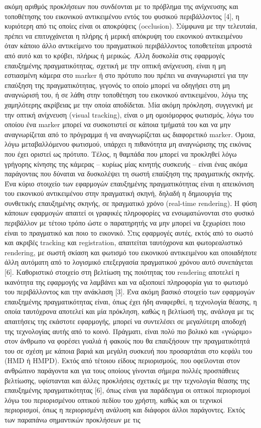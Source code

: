 ακόμη αριθμός προκλήσεων που συνδέονται με το πρόβλημα της ανίχνευσης και τοποθέτησης του εικονικού αντικειμένου εντός του φυσικού περιβάλλοντος [4], η κυριότερη από τις οποίες είναι οι αποκρύψεις (occlusion). Σύμφωνα με την τελευταία, πρέπει να επιτυγχάνεται η πλήρης ή μερική απόκρυψη του εικονικού αντικειμένου όταν κάποιο άλλο αντικείμενο του πραγματικού περιβάλλοντος τοποθετείται μπροστά από αυτό και το κρύβει, πλήρως ή μερικώς. Άλλη δυσκολία στις εφαρμογές επαυξημένης πραγματικότητας, σχετική με την οπτική ανίχνευση, είναι η μη εστιασμένη κάμερα στο marker ή στο πρότυπο που πρέπει να αναγνωριστεί για την επαύξηση της πραγματικότητας, γεγονός το οποίο μπορεί να οδηγήσει στη μη αναγνώρισή του, ή σε λάθη στην τοποθέτηση του εικονικού αντικειμένου, λόγω της χαμηλότερης ακρίβειας με την οποία αποδίδεται. Μία ακόμη πρόκληση, συγγενική με την οπτική ανίχνευση (visual tracking), είναι ο μη ομοιόμορφος φωτισμός, λόγω του οποίου ένα marker μπορεί να συσκοτιστεί σε κάποια τμήματά του και να μην αναγνωρίζεται από το πρόγραμμα ή να αναγνωρίζεται ως διαφορετικό marker. Όμοια, λόγω μεταβαλλόμενου φωτισμού, υπάρχει η πιθανότητα μη αναγνώρισης της εικόνας που έχει οριστεί ως πρότυπο. Τέλος, η θαμπάδα που μπορεί να προκληθεί λόγω γρήγορης κίνησης της κάμερας – κυρίως μίας κινητής συσκευής – είναι ένας ακόμα παράγοντας που δύναται να δυσκολέψει τη σωστή επαύξηση της πραγματικής σκηνής. Ένα κύριο στοιχείο των εφαρμογών επαυξημένης πραγματικότητας είναι η απεικόνιση του εικονικού αντικειμένου στην πραγματική σκηνή, δηλαδή η δημιουργία της συνθετικής επαυξημένης σκηνής, σε πραγματικό χρόνο (real-time rendering). Η φύση κάποιων εφαρμογών απαιτεί οι γραφικές πληροφορίες να ενσωματώνονται στο φυσικό περιβάλλον με τέτοιο τρόπο ώστε ο παρατηρητής να μην μπορεί να ξεχωρίσει ποιο είναι το πραγματικό και ποιο το εικονικό. Στις εφαρμογές αυτές, εκτός από το σωστό και ακριβές tracking και registration, απαιτείται ταυτόχρονα και φωτορεαλιστικό rendering, με σωστή σκίαση και φωτισμό του εικονικού αντικειμένου και οποιαδήποτε άλλη αυτόματη από το λογισμικό επεξεργασία πραγματικού χρόνου αυτό συνεπάγεται [6]. Καθοριστικό στοιχείο στη βελτίωση της ποιότητας του rendering αποτελεί η ικανότητα της εφαρμογής να λαμβάνει και να αξιοποιεί πληροφορία για το φωτισμό του περιβάλλοντος και την ανάκλαση [3]. Ένα ακόμη βασικό στοιχείο των εφαρμογών επαυξημένης πραγματικότητας είναι, όπως έχει ήδη αναφερθεί, η τεχνολογία θέασης, η οποία ταυτόχρονα αποτελεί και μία πρόκληση, καθώς η βελτίωσή της, ανάλογα με τις απαιτήσεις της εκάστοτε εφαρμογής, μπορεί να συντελέσει σε μεγαλύτερη αποδοχή της τεχνολογίας αυτής από το κοινό. Πράγματι, είναι πολύ πιο βολικό και «γνώριμο» στον άνθρωπο να φορέσει γυαλιά ή φακούς που θα επαυξήσουν την πραγματικότητά του σε σχέση με κάποια βαριά και μεγάλη συσκευή που προσαρτάται στο κεφάλι του (HMD ή HMPD). Εκτός από τέτοιου είδους περιορισμούς, που οφείλονται στον ανθρώπινο παράγοντα και για τους οποίους γίνονται σήμερα πολλές προσπάθειες βελτίωσης, υφίστανται και άλλες προκλήσεις σχετικές με την τεχνολογία θέασης της επαυξημένης πραγματικότητας [6], όπως είναι για παράδειγμα οι οπτικοί περιορισμοί λόγω του περιορισμένου οπτικού πεδίου του χρήστη, καθώς και οι τεχνικοί περιορισμοί, όπως η περιορισμένη ανάλυση και διάφοροι άλλοι παράγοντες. Εκτός των παραπάνω σημαντικών προκλήσεων με τις 